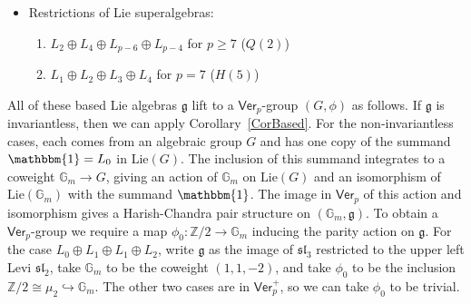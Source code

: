 \documentclass[11pt,a4paper,reqno]{amsart}
\theoremstyle{definition}
\newcommand{\mG}{\mathbb{G}}
\numberwithin{equation}{section}
\newcommand{\Ver}{\mathsf{Ver}}
\newcommand{\unit}{{\mathbbm{1}}}
\newcommand{\mZ}{\mathbb{Z}}
\newcommand{\fg}{\mathfrak{g}}
\newcommand{\fsl}{\mathfrak{sl}}
\newcommand{\fso}{\mathfrak{so}}
\newcommand{\fosp}{\mathfrak{osp}}
\newcommand{\Lie}{\mathrm{Lie}}
\begin{document}
\begin{itemize}
\begin{enumerate}
\item\label{Item4D} $L_2\oplus L_2\oplus L_{p-5}\oplus L_{p-3}=\fso(L_2\oplus L_{p-3})$ for $p\geq11$ ($D_{(p+1)/2}$ with a subregular nilpotent, $\fosp(3|2)$ with $\phi$ the diagonal map into the even part $\fsl_2\oplus\fsl_2$)
\item $L_2\oplus L_2\oplus L_2\oplus L_4$ for $p\geq7$ ($G_2(a_1)$)
\item $L_2\oplus L_4\oplus L_6\oplus L_{10}$ for $p=13$ ($E_6(a_1)$)
\item $L_2\oplus L_6\oplus L_{10}\oplus L_{16}$ for $p=19$ ($E_7(a_1)$)
\item $L_2\oplus L_{10}\oplus L_{18}\oplus L_{28}$ for $p=31$ ($E_8(a_1)$)
\setcounter{length4counter}{\value{enumi}}
\end{enumerate}
\item Restrictions of Lie superalgebras:
\begin{enumerate}
\setcounter{enumi}{\value{length4counter}}
\item $L_2\oplus L_4\oplus L_{p-6}\oplus L_{p-4}$ for $p\geq7$ ($Q(2)$)
\item $L_1\oplus L_2\oplus L_3\oplus L_4$ for $p=7$ ($H(5)$)
\end{enumerate}
\end{itemize}
All of these based Lie algebras $\fg$ lift to a $\Ver_p$-group $(G,\phi)$ as follows. If $\fg$ is invariantless, then we can apply Corollary~\ref{CorBased}. For the non-invariantless cases, each comes from an algebraic group $G$ and has one copy of the summand $\unit=L_0$ in $\Lie(G)$. The inclusion of this summand integrates to a coweight $\mG_m\to G$, giving an action of $\mG_m$ on $\Lie(G)$ and an isomorphism of $\Lie(\mG_m)$ with the summand $\unit$. The image in $\Ver_p$ of this action and isomorphism gives a Harish-Chandra pair structure on $(\mG_m,\fg)$. To obtain a $\Ver_p$-group we require a map $\phi_0:\mZ/2\to\mG_m$ inducing the parity action on $\fg$. For the case $L_0\oplus L_1\oplus L_1\oplus L_2$, write $\fg$ as the image of $\fsl_3$ restricted to the upper left Levi $\fsl_2$, take $\mG_m$ to be the coweight $(1,1,-2)$, and take $\phi_0$ to be the inclusion $\mZ/2\cong\mu_2\hookrightarrow\mG_m$. The other two cases are in $\Ver_p^+$, so we can take $\phi_0$ to be trivial.
\end{document}
